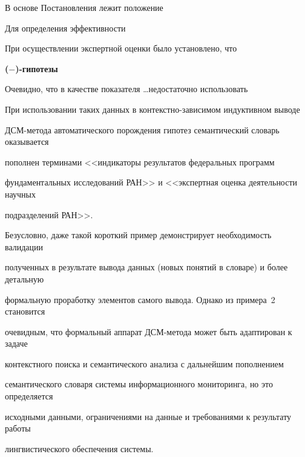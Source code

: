    \smallskip


   


   В основе Постановления лежит положение


   


   Для определения эффективности


   


   При осуществлении экспертной оценки было установлено, что


   


   \smallskip


    \textbf{($-$)-гипотезы}


   \smallskip


   


   Очевидно, что в качестве показателя \ldots недостаточно использовать


   


   При использовании таких данных в контекстно-зависимом индуктивном выводе  


ДСМ-метода автоматического порождения гипотез семантический словарь оказывается 


пополнен терминами <<индикаторы результатов федеральных программ 


фундаментальных исследований РАН>> и <<экспертная оценка деятельности научных 


подразделений РАН>>. 


   


   Безусловно, даже такой короткий пример демонстрирует необходимость валидации 


полученных в результате вывода данных (новых понятий в словаре) и более детальную 


формальную проработку элементов самого вывода. Однако из примера~2 становится 


очевидным, что формальный аппарат ДСМ-метода может быть адаптирован к задаче 


контекстного поиска и семантического анализа с дальнейшим пополнением 


семантического словаря системы информационного мониторинга, но это определяется 


исходными данными, ограничениями на данные и требованиями к результату работы 


лингвистического обеспечения системы.


